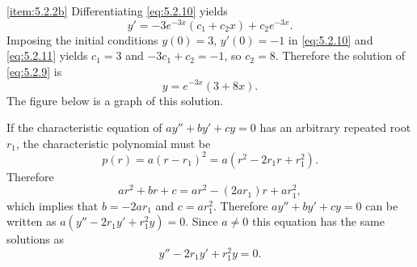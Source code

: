 \documentclass{ximera}
\begin{document}
\begin{example}
\begin{explanation}
\ref{item:5.2.2b}  Differentiating   \eqref{eq:5.2.10} yields
\begin{equation} \label{eq:5.2.11}
y'=-3e^{-3x}(c_1+c_2x)+c_2e^{-3x}.
\end{equation}
Imposing the initial conditions $y(0)=3,\, y'(0)=-1$ in \eqref{eq:5.2.10}
and \eqref{eq:5.2.11} yields $c_1=3$ and $-3c_1+c_2=-1$, so
$c_2=8$. Therefore the solution of \eqref{eq:5.2.9} is
$$
y=e^{-3x}(3+8x).
$$
The figure below is a graph of this solution.

\begin{center}
\end{center}
 
 
\end{explanation}
\end{example}
 
 
 
If the characteristic equation of $ay''+by'+cy=0$
has an arbitrary repeated root $r_1$,  the
characteristic polynomial must be
$$
p(r)=a(r-r_1)^2=a(r^2-2r_1r+r_1^2).
$$
Therefore
$$
ar^2+br+c=ar^2-(2ar_1)r+ar_1^2,
$$
which implies that $b=-2ar_1$ and $c=ar_1^2$.
Therefore
 $ay''+by'+cy=0$ can be written as
$a(y''-2r_1y'+r_1^2y)=0$. Since $a\neq 0$ this equation has the same
solutions as
\begin{equation} \label{eq:5.2.12}
y''-2r_1y'+r_1^2y=0.
\end{equation}
 
\end{document}
